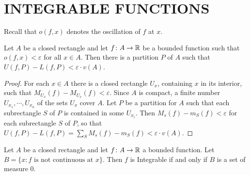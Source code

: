 \clearpage
\section[\textsc{integrable functions}]{INTEGRABLE FUNCTIONS}
Recall that $o(f,x)$ denotes the oscillation of $f$ at $x$.
\begin{lemma}
    Let $A$ be a closed rectangle and let $f\colon{}A\to \mathbb{R}$ be a bounded 
    function such that $o(f, x)<\varepsilon$ for all $x\in A$. Then 
    there is a partition $P$ of $A$ such that $U(f, P)-L(f, P)<\varepsilon\cdot v(A)$.
\end{lemma}

\begin{proof}
    For each $x \in A$ there is a closed rectangle $U_x$,
containing $x$ in its interior, such that $M_{U_x}(f) - M_{U_x}(f) < \varepsilon$.
Since $A$ is compact, a finite number $U_{x_1}, \cdots, U_{x_n}$ of the
sets $U_x$ cover $A$. Let $P$ be a partition for $A$ such that each
subrectangle $S$ of $P$ is contained in some $U_{x_i}$. Then 
$M_s(f) - m_S(f)< \varepsilon$ for each subrectangle $S$ of $P$, so that 
$U(f, P)-L(f, P)=\sum_{S}^{}{M_s(f)-m_S(f)}<\varepsilon\cdot v(A)$.
\end{proof}

\begin{theorem}
    Let $A$ be a closed rectangle and let $f\colon{}A\to \mathbb{R}$ a bounded function.
    Let $B=\{x:f\text{ is not continuous at } x\}$. Then $f$ is Integrable if 
    and only if $B$ is a set of measure 0.
\end{theorem}

